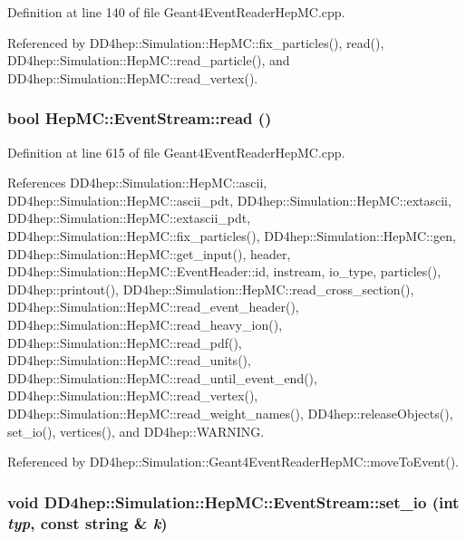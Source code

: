 Definition at line 140 of file Geant4EventReaderHepMC.cpp.

Referenced by DD4hep::Simulation::HepMC::fix\_\-particles(), read(), DD4hep::Simulation::HepMC::read\_\-particle(), and DD4hep::Simulation::HepMC::read\_\-vertex().\hypertarget{class_d_d4hep_1_1_simulation_1_1_hep_m_c_1_1_event_stream_a0a565ef129dd64aae36e05efc29a4be4}{
\subsubsection[{read}]{\setlength{\rightskip}{0pt plus 5cm}bool HepMC::EventStream::read ()}}
\label{class_d_d4hep_1_1_simulation_1_1_hep_m_c_1_1_event_stream_a0a565ef129dd64aae36e05efc29a4be4}


Definition at line 615 of file Geant4EventReaderHepMC.cpp.

References DD4hep::Simulation::HepMC::ascii, DD4hep::Simulation::HepMC::ascii\_\-pdt, DD4hep::Simulation::HepMC::extascii, DD4hep::Simulation::HepMC::extascii\_\-pdt, DD4hep::Simulation::HepMC::fix\_\-particles(), DD4hep::Simulation::HepMC::gen, DD4hep::Simulation::HepMC::get\_\-input(), header, DD4hep::Simulation::HepMC::EventHeader::id, instream, io\_\-type, particles(), DD4hep::printout(), DD4hep::Simulation::HepMC::read\_\-cross\_\-section(), DD4hep::Simulation::HepMC::read\_\-event\_\-header(), DD4hep::Simulation::HepMC::read\_\-heavy\_\-ion(), DD4hep::Simulation::HepMC::read\_\-pdf(), DD4hep::Simulation::HepMC::read\_\-units(), DD4hep::Simulation::HepMC::read\_\-until\_\-event\_\-end(), DD4hep::Simulation::HepMC::read\_\-vertex(), DD4hep::Simulation::HepMC::read\_\-weight\_\-names(), DD4hep::releaseObjects(), set\_\-io(), vertices(), and DD4hep::WARNING.

Referenced by DD4hep::Simulation::Geant4EventReaderHepMC::moveToEvent().\hypertarget{class_d_d4hep_1_1_simulation_1_1_hep_m_c_1_1_event_stream_a8c27011e1d7e6ae4b72e763d9253824d}{
\subsubsection[{set\_\-io}]{\setlength{\rightskip}{0pt plus 5cm}void DD4hep::Simulation::HepMC::EventStream::set\_\-io (int {\em typ}, \/  const {\bf string} \& {\em k})}}
\label{class_d_d4hep_1_1_simulation_1_1_hep_m_c_1_1_event_stream_a8c27011e1d7e6ae4b72e763d9253824d}


